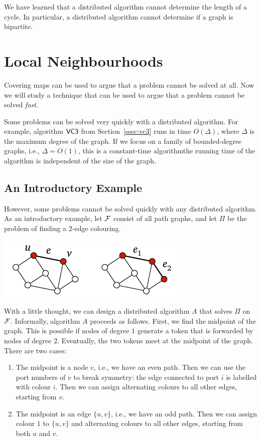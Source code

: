 We have learned that a distributed algorithm cannot determine the length of a cycle. In particular, a distributed algorithm cannot determine if a graph is bipartite.


\section{Local Neighbourhoods}\label{sec:local-neighbourhoods}

Covering maps can be used to argue that a problem cannot be solved at all. Now we will study a technique that can be used to argue that a problem cannot be solved \emph{fast}.

Some problems can be solved very quickly with a distributed algorithm. For example, algorithm $\textsf{VC3}$ from Section~\ref{ssec:vc3} runs in time $O(\Delta)$, where $\Delta$ is the maximum degree of the graph. If we focus on a family of bounded-degree graphs, i.e., $\Delta = O(1)$, this is a constant-time algorithm\mydash the running time of the algorithm is independent of the size of the graph.

\subsection{An Introductory Example}\label{ssec:local-neighbourhood-example}

However, some problems cannot be solved quickly with any distributed algorithm. As an introductory example, let $\mathcal{F}$ consist of all path graphs, and let $\Pi$ be the problem of finding a $2$-edge colouring.
\begin{center}
    \includegraphics[page=\PTwoEdgeCol]{figs.pdf}
\end{center}

With a little thought, we can design a distributed algorithm $A$ that solves $\Pi$ on $\mathcal{F}$. Informally, algorithm $A$ proceeds as follows. First, we find the midpoint of the graph. This is possible if nodes of degree $1$ generate a token that is forwarded by nodes of degree $2$. Eventually, the two tokens meet at the midpoint of the graph. There are two cases:
\begin{enumerate}
    \item The midpoint is a node $v$, i.e., we have an even path. Then we can use the port numbers of $v$ to break symmetry: the edge connected to port $i$ is labelled with colour $i$. Then we can assign alternating colours to all other edges, starting from $v$.
    \item The midpoint is an edge $\{u,v\}$, i.e., we have an odd path. Then we can assign colour $1$ to $\{u,v\}$ and alternating colours to all other edges, starting from both $u$ and $v$.
\end{enumerate}

